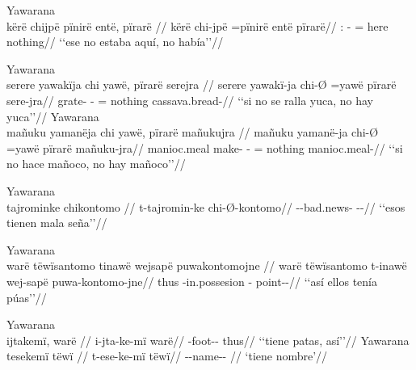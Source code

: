 \documentclass{memoir}
\begin{document}
\ex Yawarana \\
\label{ex-main-neg-pirare}    \begingl
    \glpreamble kërë chijpë pïnirë entë, pïrarë //
    \gla kërë chi-jpë =pïnirë entë pïrarë//
    \glb {}: - = here nothing//
        \glft ‘‘ese no estaba aquí, no había’’//  
    \endgl 
\xe

\pex\label{ex-main-neg-pirare-nsubj-jra}    \a Yawarana\\
    \label{desccasmaj-64}        \begingl
        \glpreamble serere yawakïja chi yawë, pïrarë serejra //
        \gla serere yawakï-ja chi-Ø =yawë pïrarë sere-jra//
        \glb  grate- - = nothing cassava.bread-//
            \glft ‘‘si no se ralla yuca, no hay yuca’’//  
        \endgl 
    \a Yawarana\\
    \label{desccasmaj-65}        \begingl
        \glpreamble mañuku yamanëja chi yawë, pïrarë mañukujra //
        \gla mañuku yamanë-ja chi-Ø =yawë pïrarë mañuku-jra//
        \glb manioc.meal make- - = nothing manioc.meal-//
            \glft ‘‘si no hace mañoco, no hay mañoco’’//  
        \endgl 
\xe

\ex Yawarana \\
\label{poss-main-aff-advpred-nsubj-cop}    \begingl
    \glpreamble tajrominke chikontomo //
    \gla t-tajromin-ke chi-Ø-kontomo//
    \glb --bad.news- --//
        \glft ‘‘esos tienen mala seña’’//  
    \endgl 
\xe

\ex Yawarana \\
\label{poss-main-aff-locpred-cop-nsubj}    \begingl
    \glpreamble warë tëwïsantomo tinawë wejsapë puwakontomojne //
    \gla warë tëwïsantomo t-inawë wej-sapë puwa-kontomo-jne//
    \glb thus  -in.possesion - point--//
        \glft ‘‘así ellos tenía púas’’//  
    \endgl 
\xe

\pex\label{poss-main-aff-npred-nsubj}    \a Yawarana\\
    \label{convinsectmaj-24}        \begingl
        \glpreamble ijtakemï, warë //
        \gla i-jta-ke-mï warë//
        \glb {}-foot-- thus//
            \glft ‘‘tiene patas, así’’//  
        \endgl 
    \a Yawarana\\
    \label{ctorosq-47}        \begingl
        \glpreamble tesekemï tëwï //
        \gla t-ese-ke-mï tëwï//
        \glb --name-- //
            \glft ‘tiene nombre’//  
        \endgl 
\xe
\end{document}
